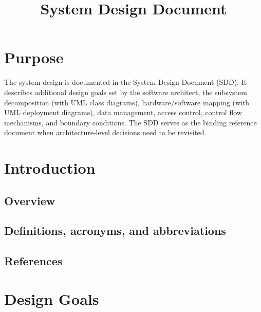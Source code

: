 \documentclass[a4paper,12pt]{article}
\makeatletter
\renewcommand{\maketitle}{\bgroup\setlength{\parindent}{0pt}
\begin{flushleft}
  {\Huge\textbf{\@title}}
\end{flushleft}\egroup
}
\makeatother
\begin{document}
 \title{System Design Document}
 \maketitle

 \section*{\color{black}Purpose}

 The system design is documented in the System Design Document (SDD). It describes additional design goals set by the software architect, the subsystem decomposition (with UML class diagrams), hardware/software mapping (with UML deployment diagrams), data management, access control, control flow mechanisms, and boundary conditions.  The SDD serves as the binding reference document when architecture-level decisions need to be revisited.

 \setcounter{tocdepth}{2}
 \tableofcontents

 \section{Introduction}

 \subsection{Overview}

 \subsection{Definitions, acronyms, and abbreviations}

 \subsection{References}



 \section{Design Goals}
\end{document}
